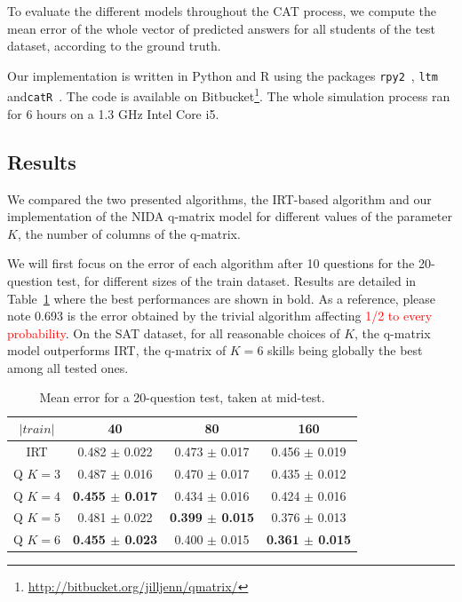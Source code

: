 \documentclass{sig-alternate}
\newcommand\alert[1]{\textcolor{red}{#1}}
\begin{document}
To evaluate the different models throughout the CAT process, we compute the mean error of the whole vector of predicted answers for all students of the test dataset, according to the ground truth.

Our implementation is written in Python and R using the packages \texttt{rpy2}~\citep{Gautier2008}, \texttt{ltm}~\citep{Rizopoulos2006} and\linebreak \texttt{catR}~\citep{MagisRaiche2012}. The code is available on Bitbucket\footnote{\url{http://bitbucket.org/jilljenn/qmatrix/}}. The whole simulation process ran for 6 hours on a 1.3 GHz Intel Core i5.

\subsection{Results}

We compared the two presented algorithms, the IRT-based algorithm and our implementation of the NIDA q-matrix model for different values of the parameter $K$, the number of columns of the q-matrix.

We will first focus on the error of each algorithm after 10 questions for the 20-question test, for different sizes of the train dataset. Results are detailed in Table~\ref{tab:20q} where the best performances are shown in bold. As a reference, please note 0.693 is the error obtained by the trivial algorithm affecting \alert{1/2 to every probability}. On the SAT dataset, for all reasonable choices of $K$, the q-matrix model outperforms IRT, the q-matrix of $K = 6$ skills being globally the best among all tested ones.

\begin{table}[H]
\small\centering\begin{tabular}{@{}cccc@{}}
$|train|$ & 40 & 80 & 160\\
\hline
IRT & 0.482 $\pm$ 0.022 & 0.473 $\pm$ 0.017 & 0.456 $\pm$ 0.019\\
Q $K = 3$ & 0.487 $\pm$ 0.016 & 0.470 $\pm$ 0.017 & 0.435 $\pm$ 0.012\\
Q $K = 4$ & \textbf{0.455 $\pm$ 0.017} & 0.434 $\pm$ 0.016 & 0.424 $\pm$ 0.016\\
Q $K = 5$ & 0.481 $\pm$ 0.022 & \textbf{0.399 $\pm$ 0.015} & 0.376 $\pm$ 0.013\\
Q $K = 6$ & \textbf{0.455 $\pm$ 0.023} & 0.400 $\pm$ 0.015 & \textbf{0.361 $\pm$ 0.015}\\
\end{tabular}
\caption{Mean error for a 20-question test, taken at mid-test.}
\label{tab:20q}
\end{table}
\end{document}

